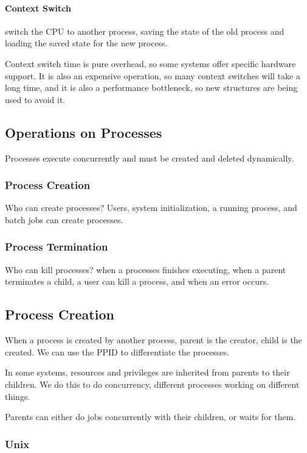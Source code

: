 \documentclass{article}
\begin{document}
\paragraph{Context Switch} switch the CPU to another process, saving the state of the old process and loading the saved state for the new process.

Context switch time is pure overhead, so some systems offer specific hardware support. It is also an expensive operation, so many context switches will take a long time, and it is also a performance bottleneck, so new structures are being used to avoid it.

\subsection{Operations on Processes}

Processes execute concurrently and must be created and deleted dynamically.

\subsubsection{Process Creation}

Who can create processes? Users, system initialization, a running process, and batch jobs can create processes.

\subsubsection{Process Termination}

Who can kill processes? when a processes finishes executing, when a parent terminates a child, a user can kill a process, and when an error occurs.

\subsection{Process Creation}

When a process is created by another process, parent is the creator, child is the created. We can use the PPID to differentiate the processes.

In some systems, resources and privileges are inherited from parents to their children. We do this to do concurrency, different processes working on different things.

Parents can either do jobs concurrently with their children, or waits for them.

\subsubsection{Unix}
\end{document}
